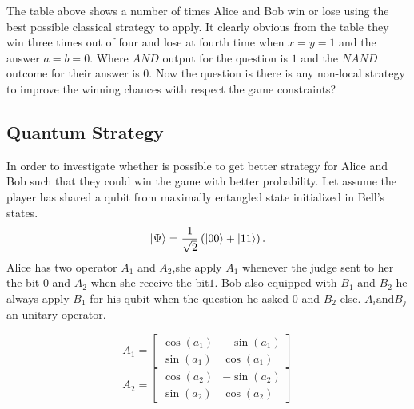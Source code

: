 The table above shows a number of times Alice and Bob win or lose using the best possible  classical strategy to apply. It clearly obvious from the table they win three times out of four and lose at fourth time when $x=y=1$ and the answer $a=b=0$. Where $AND$ output for the question is $1$ and the $NAND$ outcome for their answer is $0$.
Now the question is there is any non-local  strategy  to improve the winning chances with respect the game constraints?

\subsection{Quantum Strategy}\hfill \break
In order to investigate whether is possible to get better strategy for Alice and Bob such that they could  win the game with better probability. Let assume  the player has shared a qubit from maximally  entangled state initialized in Bell's states.
\begin{equation}
\ket{\Psi }= \frac{1}{\sqrt{2}}\left( \ket{00} +\ket{11} \right)\label{EQ:1} .
\end{equation}
Alice has two operator $A_1$ and $A_2$,she apply $A_1$ whenever the judge sent to her the bit $0$ and $A_2$ when she receive the bit$1$. Bob also equipped with $B_1$ and $B_2$ he always apply $B_1$ for his qubit when the question he asked $0$ and $B_2$ else. $A_i \text{and} B_j$ an unitary operator.

\[
A_1=
  \begin{bmatrix}
   \cos(a_1) & -\sin(a_1)\\
   \sin(a_1) & \cos(a_1)
  \end{bmatrix}
\]
\[
A_2=
  \begin{bmatrix}
   \cos(a_2) & -\sin(a_2)\\
   \sin(a_2) & \cos(a_2)
  \end{bmatrix}
\]

